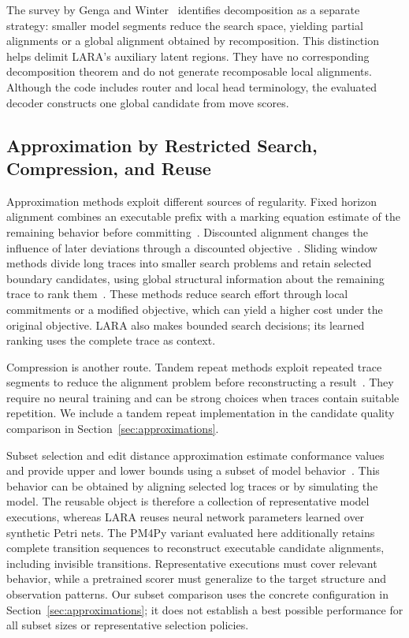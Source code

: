 \begin{revised}The survey by Genga and Winter~\cite{Genga2025} identifies decomposition as a separate strategy: smaller model segments reduce the search space, yielding partial alignments or a global alignment obtained by recomposition. This distinction helps delimit LARA's auxiliary latent regions. They have no corresponding decomposition theorem and do not generate recomposable local alignments. Although the code includes router and local head terminology, the evaluated decoder constructs one global candidate from move scores.\end{revised}

\subsection{Approximation by Restricted Search, Compression, and Reuse}

Approximation methods exploit different sources of regularity. Fixed horizon alignment combines an executable prefix with a marking equation estimate of the remaining behavior before committing~\cite{Dongen2017}. Discounted alignment changes the influence of later deviations through a discounted objective~\cite{Boltenhagen2021}. Sliding window methods divide long traces into smaller search problems and retain selected boundary candidates, using global structural information about the remaining trace to rank them~\cite{Bogdanov2024}. These methods reduce search effort through local commitments or a modified objective, which can yield a higher cost under the original objective. LARA also makes bounded search decisions; its learned ranking uses the complete trace as context.

\begin{revised}Compression is another route. Tandem repeat methods exploit repeated trace segments to reduce the alignment problem before reconstructing a result~\cite{ReissnerTandem2020}. They require no neural training and can be strong choices when traces contain suitable repetition. We include a tandem repeat implementation in the candidate quality comparison in Section~\ref{sec:approximations}.\end{revised}

Subset selection and edit distance approximation estimate conformance values and provide upper and lower bounds using a subset of model behavior~\cite{FaniSani2020}. This behavior can be obtained by aligning selected log traces or by simulating the model. The reusable object is therefore a collection of representative model executions, whereas LARA reuses neural network parameters learned over synthetic Petri nets. The PM4Py variant evaluated here additionally retains complete transition sequences to reconstruct executable candidate alignments, including invisible transitions. Representative executions must cover relevant behavior, while a pretrained scorer must generalize to the target structure and observation patterns. Our subset comparison uses the concrete configuration in Section~\ref{sec:approximations}; it does not establish a best possible performance for all subset sizes or representative selection policies.

